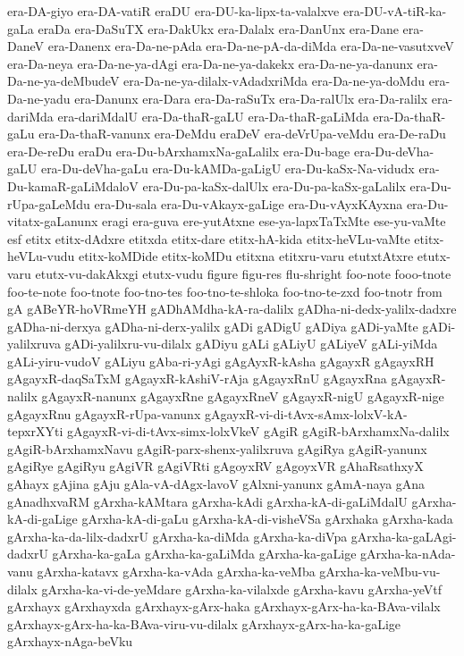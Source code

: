 {era-DA-giyo
era-DA-vatiR
eraDU
era-DU-ka-lipx-ta-valalxve
era-DU-vA-tiR-ka-gaLa
eraDa
era-DaSuTX
era-DakUkx
era-Dalalx
era-DanUnx
era-Dane
era-DaneV
era-Danenx
era-Da-ne-pAda
era-Da-ne-pA-da-diMda
era-Da-ne-vasutxveV
era-Da-neya
era-Da-ne-ya-dAgi
era-Da-ne-ya-dakekx
era-Da-ne-ya-danunx
era-Da-ne-ya-deMbudeV
era-Da-ne-ya-dilalx-vAdadxriMda
era-Da-ne-ya-doMdu
era-Da-ne-yadu
era-Danunx
era-Dara
era-Da-raSuTx
era-Da-ralUlx
era-Da-ralilx
era-dariMda
era-dariMdalU
era-Da-thaR-gaLU
era-Da-thaR-gaLiMda
era-Da-thaR-gaLu
era-Da-thaR-vanunx
era-DeMdu
eraDeV
era-deVrUpa-veMdu
era-De-raDu
era-De-reDu
eraDu
era-Du-bArxhamxNa-gaLalilx
era-Du-bage
era-Du-deVha-gaLU
era-Du-deVha-gaLu
era-Du-kAMDa-gaLigU
era-Du-kaSx-Na-vidudx
era-Du-kamaR-gaLiMdaloV
era-Du-pa-kaSx-dalUlx
era-Du-pa-kaSx-gaLalilx
era-Du-rUpa-gaLeMdu
era-Du-sala
era-Du-vAkayx-gaLige
era-Du-vAyxKAyxna
era-Du-vitatx-gaLanunx
eragi
era-guva
ere-yutAtxne
ese-ya-lapxTaTxMte
ese-yu-vaMte
esf
etitx
etitx-dAdxre
etitxda
etitx-dare
etitx-hA-kida
etitx-heVLu-vaMte
etitx-heVLu-vudu
etitx-koMDide
etitx-koMDu
etitxna
etitxru-varu
etutxtAtxre
etutx-varu
etutx-vu-dakAkxgi
etutx-vudu
figure
figu-res
flu-shright
foo-note
fooo-tnote
foo-te-note
foo-tnote
foo-tno-tes
foo-tno-te-shloka
foo-tno-te-zxd
foo-tnotr
from
gA
gABeYR-hoVRmeYH
gADhAMdha-kA-ra-dalilx
gADha-ni-dedx-yalilx-dadxre
gADha-ni-derxya
gADha-ni-derx-yalilx
gADi
gADigU
gADiya
gADi-yaMte
gADi-yalilxruva
gADi-yalilxru-vu-dilalx
gADiyu
gALi
gALiyU
gALiyeV
gALi-yiMda
gALi-yiru-vudoV
gALiyu
gAba-ri-yAgi
gAgAyxR-kAsha
gAgayxR
gAgayxRH
gAgayxR-daqSaTxM
gAgayxR-kAshiV-rAja
gAgayxRnU
gAgayxRna
gAgayxR-nalilx
gAgayxR-nanunx
gAgayxRne
gAgayxRneV
gAgayxR-nigU
gAgayxR-nige
gAgayxRnu
gAgayxR-rUpa-vanunx
gAgayxR-vi-di-tAvx-sAmx-lolxV-kA-tepxrXYti
gAgayxR-vi-di-tAvx-simx-lolxVkeV
gAgiR
gAgiR-bArxhamxNa-dalilx
gAgiR-bArxhamxNavu
gAgiR-parx-shenx-yalilxruva
gAgiRya
gAgiR-yanunx
gAgiRye
gAgiRyu
gAgiVR
gAgiVRti
gAgoyxRV
gAgoyxVR
gAhaRsathxyX
gAhayx
gAjina
gAju
gAla-vA-dAgx-lavoV
gAlxni-yanunx
gAmA-naya
gAna
gAnadhxvaRM
gArxha-kAMtara
gArxha-kAdi
gArxha-kA-di-gaLiMdalU
gArxha-kA-di-gaLige
gArxha-kA-di-gaLu
gArxha-kA-di-visheVSa
gArxhaka
gArxha-kada
gArxha-ka-da-lilx-dadxrU
gArxha-ka-diMda
gArxha-ka-diVpa
gArxha-ka-gaLAgi-dadxrU
gArxha-ka-gaLa
gArxha-ka-gaLiMda
gArxha-ka-gaLige
gArxha-ka-nAda-vanu
gArxha-katavx
gArxha-ka-vAda
gArxha-ka-veMba
gArxha-ka-veMbu-vu-dilalx
gArxha-ka-vi-de-yeMdare
gArxha-ka-vilalxde
gArxha-kavu
gArxha-yeVtf
gArxhayx
gArxhayxda
gArxhayx-gArx-haka
gArxhayx-gArx-ha-ka-BAva-vilalx
gArxhayx-gArx-ha-ka-BAva-viru-vu-dilalx
gArxhayx-gArx-ha-ka-gaLige
gArxhayx-nAga-beVku
}
